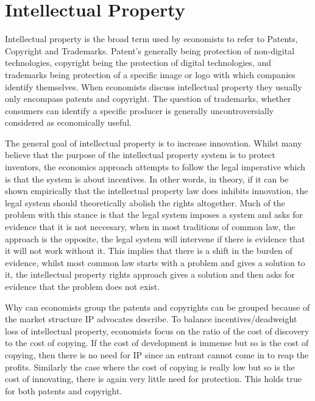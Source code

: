 \documentclass[12pt]{article}
\numberwithin{equation}{section}
\begin{document}
\section{Intellectual Property}

Intellectual property is the broad term used by economists to refer to Patents, Copyright and Trademarks. Patent's generally being protection of non-digital technologies, copyright being the protection of digital technologies, and trademarks being protection of a specific image or logo with which companies identify themselves. When economists discuss intellectual property they usually only encompass patents and copyright. The question of trademarks, whether consumers can identify a specific producer is generally uncontroversially considered as economically useful.  


The general goal of intellectual property is to increase innovation. Whilst many believe that the purpose of the intellectual property system is to protect inventors, the economics approach attempts to follow the legal imperative which is that the system is about incentives. In other words, in theory, if it can be shown empirically that the intellectual property law does inhibits innovation, the legal system should theoretically abolish the rights altogether. Much of the problem with this stance is that the legal system imposes a system and asks for evidence that it is not neccesary, when in most traditions of common law, the approach is the opposite, the legal system will intervene if there is evidence that it will not work without it. This implies that there is a shift in the burden of evidence, whilst most common law starts with a problem and gives a solution to it, the intellectual property rights approach gives a solution and then asks for evidence that the problem does not exist. 


Why can economists group the patents and copyrights can be grouped because of the market structure IP advocates describe. To balance incentives/deadweight loss of intellectual property, economists focus on the ratio of the cost of discovery to the cost of copying. If the cost of development is immense but so is the cost of copying, then there is no need for IP since an entrant cannot come in to reap the profits. Similarly the case where the cost of copying is really low but so is the cost of innovating, there is again very little need for protection. This holds true for both patents and copyright.
\end{document}
